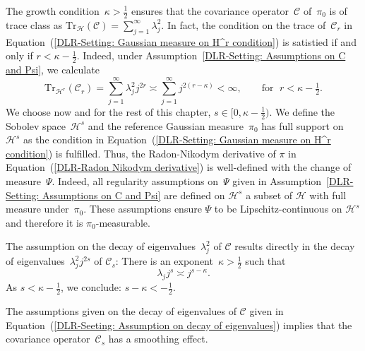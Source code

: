 \begin{rem}
 The growth condition~$\kappa > \tfrac{1}{2}$ ensures that the covariance operator~$\mathcal{C}$ of~$\pi_0$ is of trace class as $\text{Tr}_{\mathcal{H}}(\mathcal{C}) = \sum_{j=1}^{\infty} \lambda_j^2$. In fact, the condition on the trace of~$\mathcal{C}_r$ in Equation~(\ref{DLR-Setting: Gaussian measure on H^r condition}) is satistied if and only if $r < \kappa - \tfrac{1}{2}$. Indeed, under Assumption~\ref{DLR-Setting: Assumptions on C and Psi}, we calculate
 \begin{equation*}
  \text{Tr}_{\mathcal{H}^r}(\mathcal{C}_r) = \sum_{j=1}^{\infty} \lambda_j^2 j^{2r}  \asymp \sum_{j=1}^{\infty} j^{2(r-\kappa)} < \infty, \qquad \text{for } \; r < \kappa - \tfrac{1}{2}.
 \end{equation*}
 We choose now and for the rest of this chapter, $s \in [0, \kappa - \tfrac{1}{2})$. We define the Sobolev space~$\mathcal{H}^s$ and the reference Gaussian measure~$\pi_0$ has full support on~$\mathcal{H}^s$ as the condition in Equation~(\ref{DLR-Setting: Gaussian measure on H^r condition}) is fulfilled. Thus, the Radon-Nikodym derivative of $\pi$ in Equation~(\ref{DLR-Radon Nikodym derivative}) is well-defined with the change of measure~$\Psi$. Indeed, all regularity assumptions on~$\Psi$ given in Assumption~\ref{DLR-Setting: Assumptions on C and Psi} are defined on $\mathcal{H}^s$ a subset of $\mathcal{H}$ with full measure under~$\pi_0$. These assumptions ensure $\Psi$ to be Lipschitz-continuous on $\mathcal{H}^s$ and therefore it is $\pi_0$-measurable. 

\end{rem}


\begin{rem}
  The assumption on the decay of eigenvalues~$\lambda_j^2$ of $\mathcal{C}$ results directly in the decay of eigenvalues~$\lambda_j^2 j^{2s}$ of $\mathcal{C}_s$: There is an exponent~$\kappa > \tfrac{1}{2}$ such that
 \begin{equation}
 \label{DLR-Seeting: Assumption on decay of eigenvalues of C_s}
 \lambda_j j^{s} \asymp j^{s - \kappa}.
 \end{equation}
 As $s < \kappa -\tfrac{1}{2}$, we conclude: $ s -\kappa < - \tfrac{1}{2} $.
\end{rem}



The assumptions given on the decay of eigenvalues of $\mathcal{C}$ given in Equation~(\ref{DLR-Seeting: Assumption on decay of eigenvalues}) implies that the covariance operator~$\mathcal{C}_s$ has a smoothing effect.

